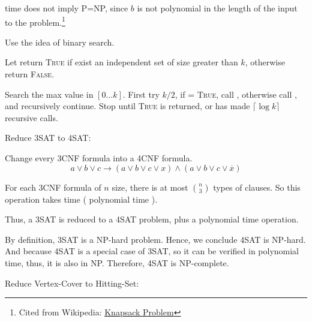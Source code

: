 \documentclass[12pt,letterpaper,titlepage,en-US]{article}
\begin{document}
\begin{homeworkProblem}[NP-completeness]
    \begin{homeworkSubProblem}
     time does not imply P=NP, since $b$ is not polynomial in the length of the input
    to the problem.\footnote{Cited from Wikipedia:
    \href{https://en.wikipedia.org/wiki/Knapsack_problem}{Knapsack Problem}}
\end{homeworkSubProblem}

\begin{homeworkSubProblem}
Use the idea of binary search.

Let  return \textsc{True} if exist
an independent set of size greater than $k$, otherwise return \textsc{False}.

Search the max value in $[0 \ldots k]$.
First try $k/2$, if  = \textsc{True},
call ,
otherwise
call ,
and recursively continue.
Stop until \textsc{True} is returned,
or has made $\lceil\log k\rceil$ recursive calls.

\end{homeworkSubProblem}

\begin{homeworkSubProblem}[4SAT]
Reduce 3SAT to 4SAT:

Change every 3CNF formula into a 4CNF formula.
\[a \lor b \lor c \longrightarrow (a \lor b \lor c \lor x) \land (a \lor b \lor c \lor \overline{x})\]

For each 3CNF formula of $n$ size, there is at most $\binom{n}{3}$ types of clauses.
So this operation takes  time ( polynomial time ).

Thus, a 3SAT is reduced to a 4SAT problem, plus a polynomial time operation.

By definition, 3SAT is a NP-hard problem. Hence, we conclude 4SAT is NP-hard.
And because 4SAT is a special case of 3SAT, so it can be verified in polynomial time,
thus, it is also in NP.
Therefore, 4SAT is NP-complete.\hfill\qedsymbol
\end{homeworkSubProblem}

\begin{homeworkSubProblem}
Reduce Vertex-Cover to Hitting-Set:


\end{homeworkSubProblem}
\end{homeworkProblem}
\end{document}
